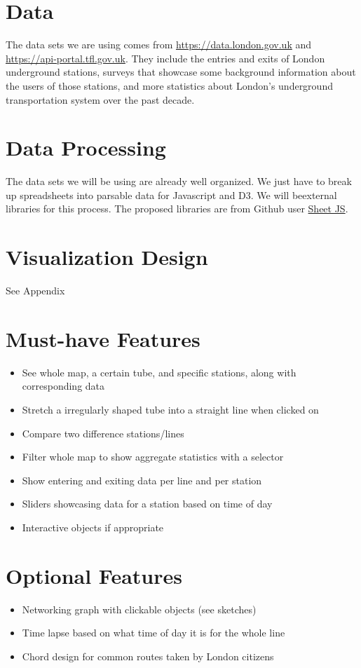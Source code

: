 \documentclass[11pt]{article} %
\begin{document}
\section{Data}
The data sets we are using comes from \url{https://data.london.gov.uk} and \url{https://api-portal.tfl.gov.uk}. They include the entries and exits of London underground stations, surveys that showcase some background information about the users of those stations, and more statistics about London's underground transportation system over the past decade.

\section{Data Processing}
The data sets we will be using are already well organized. We just have to break up spreadsheets into parsable data for Javascript and D3. We will beexternal libraries for this process. The proposed libraries are from Github user \href{https://github.com/sheetjs}{Sheet JS}.

\section{Visualization Design}
See Appendix

\section{Must-have Features}
\begin{itemize}
\item See whole map, a certain tube, and specific stations, along with corresponding data
\item Stretch a irregularly shaped tube into a straight line when clicked on
\item Compare two difference stations/lines
\item Filter whole map to show aggregate statistics with a selector
\item Show entering and exiting data per line and per station
\item Sliders showcasing data for a station based on time of day 
\item Interactive objects if appropriate 
\end{itemize}

\section{Optional Features}
\begin{itemize}
\item Networking graph with clickable objects (see sketches) 
\item Time lapse based on what time of day it is for the whole line
\item Chord design for common routes taken by London citizens
\end{itemize}
\end{document}
